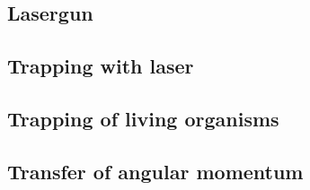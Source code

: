 \documentclass[12pt,english,ngerman]{scrartcl}
\begin{document}
\subsection{Lasergun}


\subsection{Trapping with laser}


\subsection{Trapping of living organisms}


\subsection{Transfer of angular momentum}





\newpage
\printbibliography
\listoffigures
\listoftables
\end{document}
